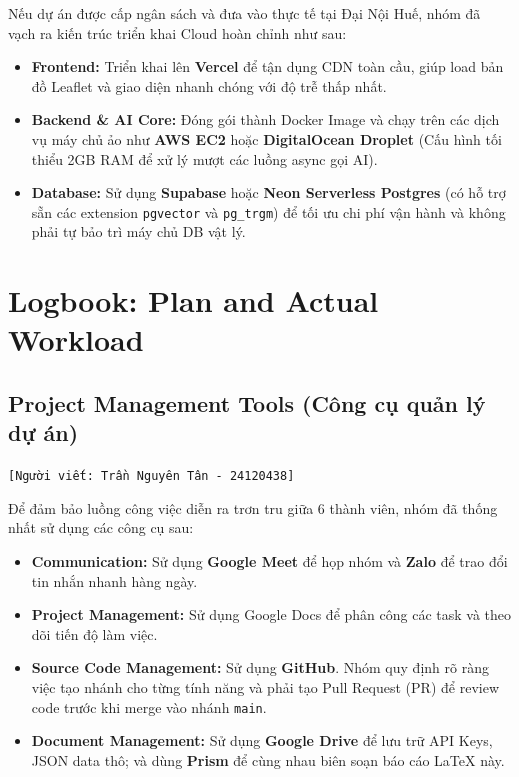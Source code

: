Nếu dự án được cấp ngân sách và đưa vào thực tế tại Đại Nội Huế, nhóm đã vạch ra kiến trúc triển khai Cloud hoàn chỉnh như sau:
\begin{itemize}
    \item \textbf{Frontend:} Triển khai lên \textbf{Vercel} để tận dụng CDN toàn cầu, giúp load bản đồ Leaflet và giao diện nhanh chóng với độ trễ thấp nhất.
    \item \textbf{Backend \& AI Core:} Đóng gói thành Docker Image và chạy trên các dịch vụ máy chủ ảo như \textbf{AWS EC2} hoặc \textbf{DigitalOcean Droplet} (Cấu hình tối thiểu 2GB RAM để xử lý mượt các luồng async gọi AI).
    \item \textbf{Database:} Sử dụng \textbf{Supabase} hoặc \textbf{Neon Serverless Postgres} (có hỗ trợ sẵn các extension \texttt{pgvector} và \texttt{pg\_trgm}) để tối ưu chi phí vận hành và không phải tự bảo trì máy chủ DB vật lý.
\end{itemize}

\section{Logbook: Plan and Actual Workload}

\subsection{Project Management Tools (Công cụ quản lý dự án)}
\texttt{[Người viết: Trần Nguyên Tân - 24120438]}

Để đảm bảo luồng công việc diễn ra trơn tru giữa 6 thành viên, nhóm đã thống nhất sử dụng các công cụ sau:
\begin{itemize}
    \item \textbf{Communication:} Sử dụng \textbf{Google Meet} để họp nhóm và \textbf{Zalo} để trao đổi tin nhắn nhanh hàng ngày.
    \item \textbf{Project Management:} Sử dụng Google Docs để phân công các task và theo dõi tiến độ làm việc.
    \item \textbf{Source Code Management:} Sử dụng \textbf{GitHub}. Nhóm quy định rõ ràng việc tạo nhánh cho từng tính năng và phải tạo Pull Request (PR) để review code trước khi merge vào nhánh \texttt{main}.
    \item \textbf{Document Management:} Sử dụng \textbf{Google Drive} để lưu trữ API Keys, JSON data thô; và dùng \textbf{Prism} để cùng nhau biên soạn báo cáo LaTeX này.
\end{itemize}


